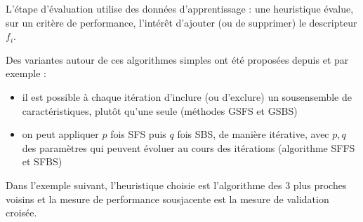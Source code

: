 \documentclass[letterpaper,10pt,english]{jupyterBook}
\begin{document}
\sphinxAtStartPar
L’étape d’évaluation utilise des données d’apprentissage : une heuristique évalue, sur un critère de performance, l’intérêt d’ajouter (ou de supprimer) le descripteur \(f_i\).

\sphinxAtStartPar
Des variantes autour de ces algorithmes simples ont été proposées depuis et par exemple :
\begin{itemize}
\item {} 
\sphinxAtStartPar
il est possible à chaque itération d’inclure (ou d’exclure) un sous\sphinxhyphen{}ensemble de caractéristiques, plutôt qu’une seule (méthodes GSFS et GSBS)

\item {} 
\sphinxAtStartPar
on peut appliquer \(p\) fois SFS puis \(q\) fois SBS, de manière itérative, avec \(p,q\) des paramètres qui peuvent évoluer au cours des itérations (algorithme SFFS et SFBS)

\end{itemize}

\sphinxAtStartPar
Dans l’exemple suivant, l’heuristique choisie est l’algorithme des 3 plus proches voisins et la mesure de performance sous\sphinxhyphen{}jacente est la mesure de validation croisée.
\end{document}
